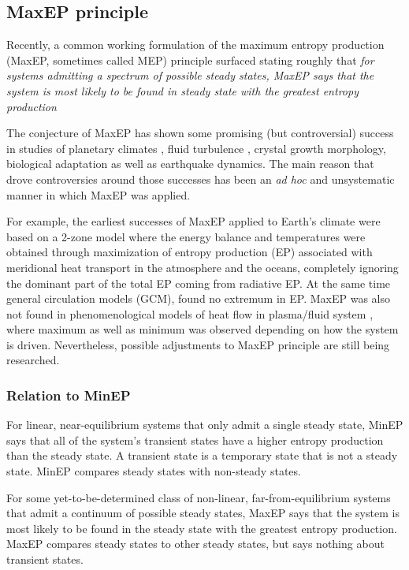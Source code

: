 \documentclass[a4paper,12pt]{article}
\begin{document}
\subsection{MaxEP principle}

Recently, a common working formulation of the maximum entropy production (MaxEP, sometimes called MEP) principle surfaced stating roughly that \textit{for systems admitting a spectrum of possible steady states, MaxEP says that the system is most likely to be found in steady state  with the greatest entropy production}

The conjecture of MaxEP has shown some promising (but controversial) success in studies of planetary climates \cite{Paltridge:2007jf}, fluid turbulence \cite{Ozawa:2003jt} \cite{MALKUS:2003ix}, crystal growth morphology, biological adaptation as well as earthquake dynamics. %
The main reason that drove controversies around those successes has been an \textit{ad hoc} and unsystematic manner in which MaxEP was applied.

For example, the earliest successes of MaxEP applied to Earth's climate were based on a 2-zone model where the energy balance and temperatures were obtained through maximization of entropy production (EP) associated with meridional heat transport in the atmosphere and the oceans, completely ignoring the dominant part of the total EP coming from radiative EP. At the same time general circulation models (GCM), found no extremum in EP. MaxEP was also not found in phenomenological models of heat flow in plasma/fluid system \cite{Kawazura:2010dy}, where maximum as well as minimum was observed depending on how the system is driven. Nevertheless, possible adjustments to MaxEP principle are still being researched.

\subsubsection{Relation to MinEP}
For linear, near-equilibrium systems that only admit a single steady state, MinEP says that all of the system's transient states have a higher entropy production than the steady state. A transient state is a temporary state that is not a steady state. MinEP compares steady states with non-steady states.

For some yet-to-be-determined class of non-linear, far-from-equilibrium systems that admit a continuum of possible steady states, MaxEP says that the system is most likely to be found in the steady state with the greatest entropy production. MaxEP compares steady states to other steady states, but says nothing about transient states.
\end{document}
